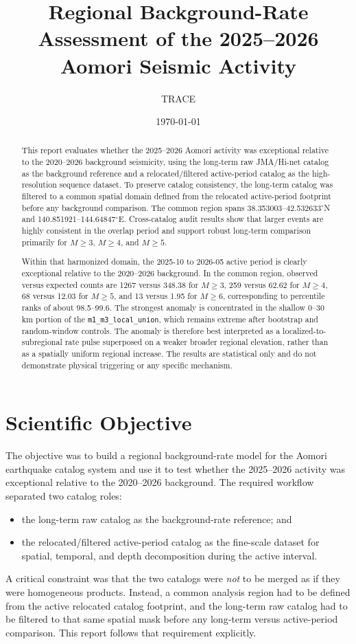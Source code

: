 \documentclass[11pt]{article}
\title{Regional Background-Rate Assessment of the 2025--2026 Aomori Seismic Activity}
\author{TRACE}
\date{\today}
\begin{document}
\maketitle

\begin{abstract}
This report evaluates whether the 2025--2026 Aomori activity was exceptional relative to the 2020--2026 background seismicity, using the long-term raw JMA/Hi-net catalog as the background reference and a relocated/filtered active-period catalog as the high-resolution sequence dataset. To preserve catalog consistency, the long-term catalog was filtered to a common spatial domain defined from the relocated active-period footprint before any background comparison. The common region spans 38.353003--42.532633$^{\circ}$N and 140.851921--144.64847$^{\circ}$E. Cross-catalog audit results show that larger events are highly consistent in the overlap period and support robust long-term comparison primarily for $M\geq 3$, $M\geq 4$, and $M\geq 5$.

Within that harmonized domain, the 2025-10 to 2026-05 active period is clearly exceptional relative to the 2020--2026 background. In the common region, observed versus expected counts are 1267 versus 348.38 for $M\geq 3$, 259 versus 62.62 for $M\geq 4$, 68 versus 12.03 for $M\geq 5$, and 13 versus 1.95 for $M\geq 6$, corresponding to percentile ranks of about 98.5--99.6. The strongest anomaly is concentrated in the shallow 0--30 km portion of the \texttt{m1\_m3\_local\_union}, which remains extreme after bootstrap and random-window controls. The anomaly is therefore best interpreted as a localized-to-subregional rate pulse superposed on a weaker broader regional elevation, rather than as a spatially uniform regional increase. The results are statistical only and do not demonstrate physical triggering or any specific mechanism.
\end{abstract}

\section{Scientific Objective}
The objective was to build a regional background-rate model for the Aomori earthquake catalog system and use it to test whether the 2025--2026 activity was exceptional relative to the 2020--2026 background. The required workflow separated two catalog roles:
\begin{itemize}[leftmargin=1.5em]
    \item the long-term raw catalog as the background-rate reference; and
    \item the relocated/filtered active-period catalog as the fine-scale dataset for spatial, temporal, and depth decomposition during the active interval.
\end{itemize}
A critical constraint was that the two catalogs were \emph{not} to be merged as if they were homogeneous products. Instead, a common analysis region had to be defined from the active relocated catalog footprint, and the long-term raw catalog had to be filtered to that same spatial mask before any long-term versus active-period comparison. This report follows that requirement explicitly.
\end{document}

